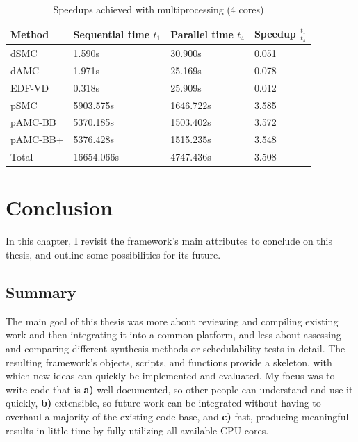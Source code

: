 \documentclass[a4paper,oneside]{csthesis}
\begin{document}
\begin{table}[ht]
    \centering
    \caption{Speedups achieved with multiprocessing (4 cores)}
    \label{tbl:speedup}
    \begin{tabular}{@{}llll@{}}
        \toprule
        Method & Sequential time $t_1$ & Parallel time $t_4$ & Speedup $\frac{t_1}{t_4}$ \\ \midrule
        dSMC & 1.590s & 30.900s & 0.051 \\
        dAMC & 1.971s & 25.169s & 0.078 \\
        EDF-VD & 0.318s & 25.909s & 0.012 \\
        pSMC & 5903.575s & 1646.722s & 3.585 \\
        pAMC-BB & 5370.185s & 1503.402s & 3.572 \\
        pAMC-BB+ & 5376.428s & 1515.235s & 3.548 \\
        Total & 16654.066s & 4747.436s & 3.508 \\
    \end{tabular}
\end{table}


\chapter{Conclusion}
\label{cha:conclusion}
In this chapter, I revisit the framework's main attributes to conclude on this thesis, and outline some possibilities for its future.

\section{Summary}
The main goal of this thesis was more about reviewing and compiling existing work and then integrating it into a common platform, and less about assessing and comparing different synthesis methods or schedulability tests in detail. The resulting framework's objects, scripts, and functions provide a skeleton, with which new ideas can quickly be implemented and evaluated. My focus was to write code that is \textbf{a)} well documented, so other people can understand and use it quickly, \textbf{b)} extensible, so future work can be integrated without having to overhaul a majority of the existing code base, and \textbf{c)} fast, producing meaningful results in little time by fully utilizing all available CPU cores.
\end{document}
